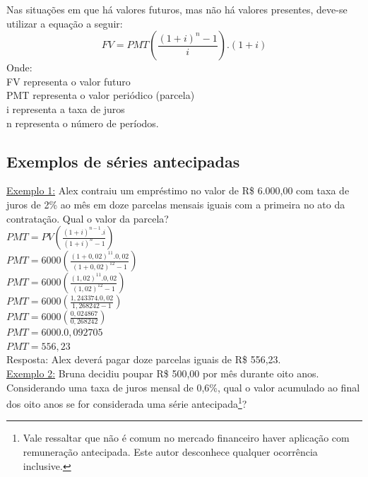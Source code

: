\documentclass[
	article,			%
	11pt,				%
	oneside,			%
	a4paper,			%
	english,			%
	brazil,				%
	sumario=tradicional
	]{abntex2}
\begin{document}
\normalsize
Nas situações em que há valores futuros, mas não há valores presentes, deve-se utilizar a equação a seguir:\\  
%
  \begin{equation}
    FV = PMT \left( \frac{ ( 1 + i ) ^{n} - 1 }{ i } \right).(1 + i) 
  \end{equation}
%
\tiny Onde: \\   FV representa o valor futuro \\ PMT representa o valor periódico (parcela) \\ i representa a taxa de juros \\ n representa o número de períodos.




\subsection{Exemplos de séries antecipadas}

\normalsize 
\noindent \underline{Exemplo 1:} Alex contraiu um empréstimo no valor de R\$ 6.000,00 com taxa de juros de 2\% ao mês em doze parcelas mensais iguais com a primeira no ato da contratação. Qual o valor da parcela?\\

\noindent $ PMT = PV \left( \frac{ ( 1 + i ) ^{n-1} .i }{ ( 1 + i ) ^{n} - 1 } \right)  $\\

\noindent $ PMT = 6000 \left( \frac{ ( 1 + 0,02 ) ^{11} .0,02 }{ ( 1 + 0,02 ) ^{12} - 1 } \right)  $\\

\noindent $ PMT = 6000 \left( \frac{ ( 1,02 ) ^{11} .0,02 }{ ( 1,02 ) ^{12} - 1 } \right)  $\\

\noindent $ PMT = 6000 \left( \frac{ 1,243374 .0,02 }{ 1,268242 - 1 } \right)  $\\

\noindent $ PMT = 6000 \left( \frac{ 0,024867 }{ 0,268242 } \right)  $\\

\noindent $ PMT = 6000 . 0,092705  $\\

\noindent $ PMT = 556,23  $\\
\noindent  Resposta: Alex deverá pagar doze parcelas iguais de R\$ 556,23. \\


\noindent \underline{Exemplo 2:} Bruna decidiu poupar R\$ 500,00 por mês durante oito anos. Considerando uma taxa de juros mensal de 0,6\%, qual o valor acumulado ao final dos oito anos se for considerada uma série antecipada\footnote{Vale ressaltar que não é comum no mercado financeiro haver aplicação com remuneração antecipada. Este autor desconhece qualquer ocorrência inclusive.}?\\
\end{document}
